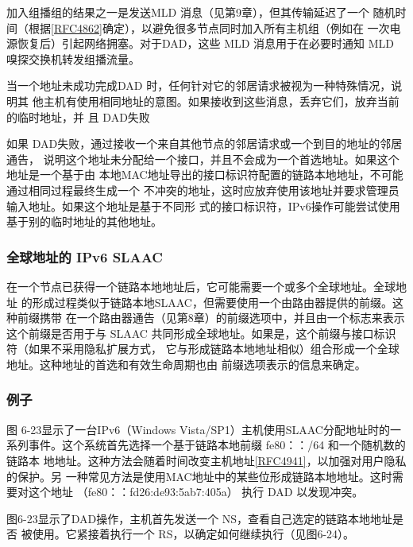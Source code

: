 \begin{tcolorbox}
  加入组播组的结果之一是发送MLD 消息（见第9章），但其传输延迟了一个
  随机时间（根据\href{https://www.rfc-editor.org/rfc/rfc4862}{\href{https://www.rfc-editor.org/rfc/rfc4862}{[RFC4862]}}确定），以避免很多节点同时加入所有主机组（例如在
  一次电源恢复后）引起网络拥塞。对于DAD，这些 MLD 消息用于在必要时通知
  MLD 嗅探交换机转发组播流量。
\end{tcolorbox}

当一个地址未成功完成DAD 时，任何针对它的邻居请求被视为一种特殊情况，说明其
他主机有使用相同地址的意图。如果接收到这些消息，丢弃它们，放弃当前的临时地址，并
且 DAD失败

如果 DAD失败，通过接收一个来自其他节点的邻居请求或一个到目的地址的邻居通告，
说明这个地址未分配给一个接口，并且不会成为一个首选地址。如果这个地址是一个基于由
本地MAC地址导出的接口标识符配置的链路本地地址，不可能通过相同过程最终生成一个
不冲突的地址，这时应放弃使用该地址并要求管理员输入地址。如果这个地址是基于不同形
式的接口标识符，IPv6操作可能尝试使用基于别的临时地址的其他地址。

\subsubsection{全球地址的 IPv6 SLAAC}
在一个节点已获得一个链路本地地址后，它可能需要一个或多个全球地址。全球地址
的形成过程类似于链路本地SLAAC，但需要使用一个由路由器提供的前缀。这种前缀携带
在一个路由器通告（见第8章）的前缀选项中，并且由一个标志来表示这个前缀是否用于与
SLAAC 共同形成全球地址。如果是，这个前缀与接口标识符（如果不采用隐私扩展方式，
它与形成链路本地地址相似）组合形成一个全球地址。这种地址的首选和有效生命周期也由
前缀选项表示的信息来确定。

\subsubsection{例子}
图 6-23显示了一台IPv6（Windows Vista/SP1）主机使用SLAAC分配地址时的一
系列事件。这个系统首先选择一个基于链路本地前缀 fe80：：/64 和一个随机数的链路本
地地址。这种方法会随着时间改变主机地址\href{https://www.rfc-editor.org/rfc/rfc4941}{\href{https://www.rfc-editor.org/rfc/rfc4941}{[RFC4941]}}，以加强对用户隐私的保护。另
一种常见方法是使用MAC地址中的某些位形成链路本地地址。这时需要对这个地址
（fe80：：fd26:de93:5ab7:405a） 执行 DAD 以发现冲突。

图6-23显示了DAD操作，主机首先发送一个 NS，查看自己选定的链路本地地址是否
被使用。它紧接着执行一个 RS，以确定如何继续执行（见图6-24）。

